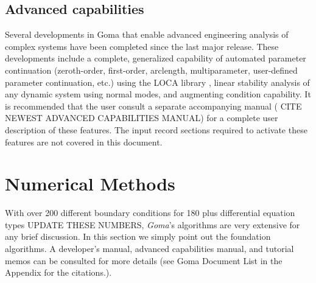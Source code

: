 \subsection{Advanced capabilities}
%
%
Several developments in Goma that enable advanced engineering analysis of complex systems have been completed since the last major release. These developments include a complete, generalized capability of automated parameter continuation (zeroth-order, first-order, arclength, multiparameter, user-defined parameter continuation, etc.) using the LOCA library \citep{LOCA_SAND}, linear stability analysis of any dynamic system using normal modes, and augmenting condition capability. It is recommended that the user consult a separate accompanying manual (\citealt{Goma_Advance_Capabilities_SAND} CITE NEWEST ADVANCED CAPABILITIES MANUAL) for a complete user description of these features. The input record sections required to activate these features are not covered in this document.
%
%
\section{Numerical Methods}
%
%
With over 200 different boundary conditions for 180 plus differential equation types UPDATE THESE NUMBERS, \emph{Goma}’s algorithms are very extensive for any brief discussion. In this section we simply point out the foundation algorithms. A developer’s manual, advanced capabilities manual, and tutorial memos can be consulted for more details (see Goma Document List in the Appendix for the citations.).

